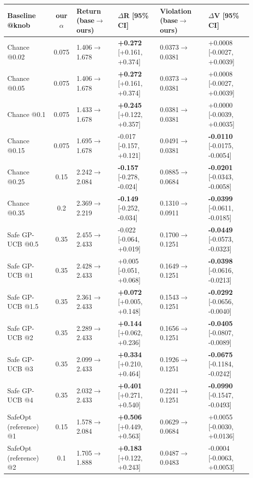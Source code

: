 \begin{tabular}{lcllll}
\toprule
Baseline @knob & our $\alpha$ & Return (base$\to$ours) & $\Delta$R [95\% CI] & Violation (base$\to$ours) & $\Delta$V [95\% CI] \\
\midrule
Chance @0.02 & 0.075 & 1.406$\to$1.678 & \textbf{+0.272} [+0.161, +0.374] & 0.0373$\to$0.0381 & +0.0008 [-0.0027, +0.0039] \\
Chance @0.05 & 0.075 & 1.406$\to$1.678 & \textbf{+0.272} [+0.161, +0.374] & 0.0373$\to$0.0381 & +0.0008 [-0.0027, +0.0039] \\
Chance @0.1 & 0.075 & 1.433$\to$1.678 & \textbf{+0.245} [+0.122, +0.357] & 0.0381$\to$0.0381 & +0.0000 [-0.0039, +0.0035] \\
Chance @0.15 & 0.075 & 1.695$\to$1.678 & -0.017 [-0.157, +0.121] & 0.0491$\to$0.0381 & \textbf{-0.0110} [-0.0175, -0.0054] \\
Chance @0.25 & 0.15 & 2.242$\to$2.084 & \textbf{-0.157} [-0.278, -0.024] & 0.0885$\to$0.0684 & \textbf{-0.0201} [-0.0343, -0.0058] \\
Chance @0.35 & 0.2 & 2.369$\to$2.219 & \textbf{-0.149} [-0.252, -0.034] & 0.1310$\to$0.0911 & \textbf{-0.0399} [-0.0611, -0.0185] \\
Safe GP-UCB @0.5 & 0.35 & 2.455$\to$2.433 & -0.022 [-0.064, +0.019] & 0.1700$\to$0.1251 & \textbf{-0.0449} [-0.0573, -0.0323] \\
Safe GP-UCB @1 & 0.35 & 2.428$\to$2.433 & +0.005 [-0.051, +0.068] & 0.1649$\to$0.1251 & \textbf{-0.0398} [-0.0616, -0.0213] \\
Safe GP-UCB @1.5 & 0.35 & 2.361$\to$2.433 & \textbf{+0.072} [+0.005, +0.148] & 0.1543$\to$0.1251 & \textbf{-0.0292} [-0.0656, -0.0040] \\
Safe GP-UCB @2 & 0.35 & 2.289$\to$2.433 & \textbf{+0.144} [+0.062, +0.236] & 0.1656$\to$0.1251 & \textbf{-0.0405} [-0.0807, -0.0089] \\
Safe GP-UCB @3 & 0.35 & 2.099$\to$2.433 & \textbf{+0.334} [+0.210, +0.464] & 0.1926$\to$0.1251 & \textbf{-0.0675} [-0.1184, -0.0242] \\
Safe GP-UCB @4 & 0.35 & 2.032$\to$2.433 & \textbf{+0.401} [+0.271, +0.540] & 0.2241$\to$0.1251 & \textbf{-0.0990} [-0.1547, -0.0493] \\
SafeOpt (reference) @1 & 0.15 & 1.578$\to$2.084 & \textbf{+0.506} [+0.449, +0.563] & 0.0629$\to$0.0684 & +0.0055 [-0.0030, +0.0136] \\
SafeOpt (reference) @2 & 0.1 & 1.705$\to$1.888 & \textbf{+0.183} [+0.122, +0.243] & 0.0487$\to$0.0483 & -0.0004 [-0.0063, +0.0053] \\
\bottomrule
\end{tabular}
